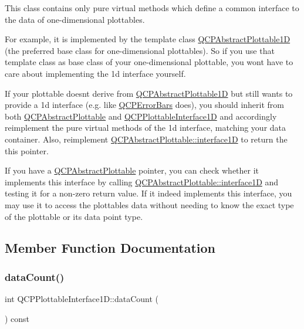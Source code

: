 This class contains only pure virtual methods which define a common interface to the data of one-\/dimensional plottables.

For example, it is implemented by the template class \hyperlink{class_q_c_p_abstract_plottable1_d}{Q\+C\+P\+Abstract\+Plottable1D} (the preferred base class for one-\/dimensional plottables). So if you use that template class as base class of your one-\/dimensional plottable, you won\textquotesingle{}t have to care about implementing the 1d interface yourself.

If your plottable doesn\textquotesingle{}t derive from \hyperlink{class_q_c_p_abstract_plottable1_d}{Q\+C\+P\+Abstract\+Plottable1D} but still wants to provide a 1d interface (e.\+g. like \hyperlink{class_q_c_p_error_bars}{Q\+C\+P\+Error\+Bars} does), you should inherit from both \hyperlink{class_q_c_p_abstract_plottable}{Q\+C\+P\+Abstract\+Plottable} and \hyperlink{class_q_c_p_plottable_interface1_d}{Q\+C\+P\+Plottable\+Interface1D} and accordingly reimplement the pure virtual methods of the 1d interface, matching your data container. Also, reimplement \hyperlink{class_q_c_p_abstract_plottable_a81fd9fd5c4f429c074785e2eb238a8e7}{Q\+C\+P\+Abstract\+Plottable\+::interface1D} to return the {\ttfamily this} pointer.

If you have a \hyperlink{class_q_c_p_abstract_plottable}{Q\+C\+P\+Abstract\+Plottable} pointer, you can check whether it implements this interface by calling \hyperlink{class_q_c_p_abstract_plottable_a81fd9fd5c4f429c074785e2eb238a8e7}{Q\+C\+P\+Abstract\+Plottable\+::interface1D} and testing it for a non-\/zero return value. If it indeed implements this interface, you may use it to access the plottable\textquotesingle{}s data without needing to know the exact type of the plottable or its data point type. 

\subsection{Member Function Documentation}
\mbox{\label{class_q_c_p_plottable_interface1_d_a058a22c770ef4d5a0e878a7f02183da9}} 
\subsubsection{\texorpdfstring{data\+Count()}{dataCount()}}
{\footnotesize\ttfamily int Q\+C\+P\+Plottable\+Interface1\+D\+::data\+Count (\begin{DoxyParamCaption}{ }\end{DoxyParamCaption}) const\hspace{0.3cm}{\ttfamily [pure virtual]}}

